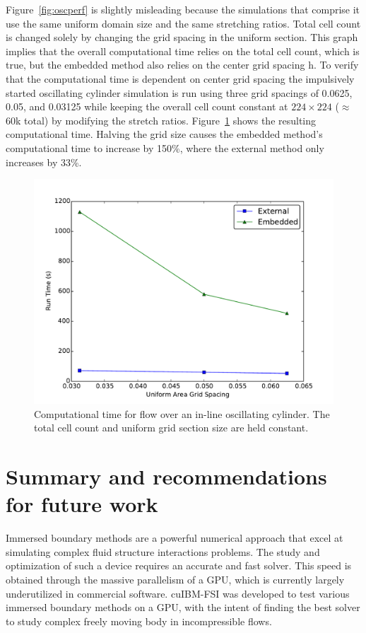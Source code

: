 \documentclass[preprint,12pt]{elsarticle}
\begin{document}
Figure~\ref{fig:oscperf} is slightly misleading because the simulations that comprise it use the same uniform domain size and the same stretching ratios. 
Total cell count is changed solely by changing the grid spacing in the uniform section. 
This graph implies that the overall computational time relies on the total cell count, which is true, but the embedded method also relies on the center grid spacing h. 
To verify that the computational time is dependent on center grid spacing the impulsively started oscillating cylinder simulation is run using three grid spacings of 0.0625, 0.05, and 0.03125 while keeping the overall cell count constant at $224\times224$ ($\approx$60k total) by modifying the stretch ratios. 
Figure~\ref{fig:performance2} shows the resulting computational time. 
Halving the grid size causes the embedded method's computational time to increase by 150\%, where the external method only increases by 33\%.
\begin{figure}[!htb]
	\centering
	\par\medskip
	\includegraphics[width=0.6\linewidth]{performance_oscflow2}
	\caption{Computational time for flow over an in-line oscillating cylinder. The total cell count and uniform grid section size are held constant.}
	\label{fig:performance2}
\end{figure}

\section{Summary and recommendations for future work} 
Immersed boundary methods are a powerful numerical approach that excel at simulating complex fluid structure interactions problems. 
The study and optimization of such a device requires an accurate and fast solver. 
This speed is obtained through the massive parallelism of a GPU, which is currently largely underutilized in commercial software. 
cuIBM-FSI was developed to test various immersed boundary methods on a GPU, with the intent of finding the best solver to study complex freely moving body in incompressible flows. 
\end{document}

